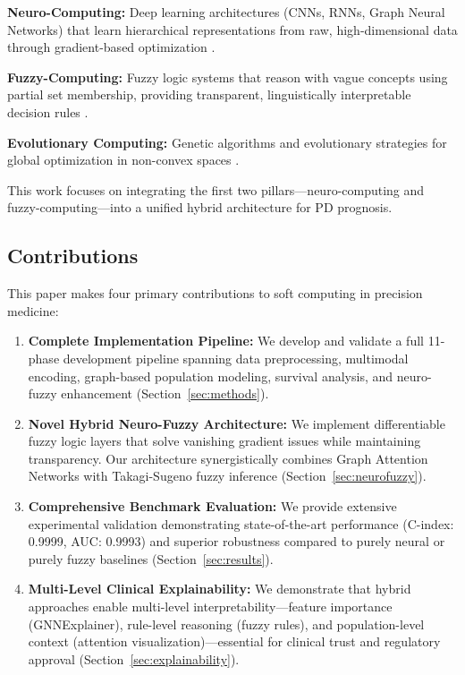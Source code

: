 \documentclass[conference]{IEEEtran}
\begin{document}
\textbf{Neuro-Computing:} Deep learning architectures (CNNs, RNNs, Graph Neural Networks) that learn hierarchical representations from raw, high-dimensional data through gradient-based optimization \cite{lecun2015deep}.

\textbf{Fuzzy-Computing:} Fuzzy logic systems that reason with vague concepts using partial set membership, providing transparent, linguistically interpretable decision rules \cite{zadeh1965fuzzy}.

\textbf{Evolutionary Computing:} Genetic algorithms and evolutionary strategies for global optimization in non-convex spaces \cite{goldberg1989genetic}.

This work focuses on integrating the first two pillars---neuro-computing and fuzzy-computing---into a unified hybrid architecture for PD prognosis.

\subsection{Contributions}

This paper makes four primary contributions to soft computing in precision medicine:

\begin{enumerate}
    \item \textbf{Complete Implementation Pipeline:} We develop and validate a full 11-phase development pipeline spanning data preprocessing, multimodal encoding, graph-based population modeling, survival analysis, and neuro-fuzzy enhancement (Section~\ref{sec:methods}).
    
    \item \textbf{Novel Hybrid Neuro-Fuzzy Architecture:} We implement differentiable fuzzy logic layers that solve vanishing gradient issues while maintaining transparency. Our architecture synergistically combines Graph Attention Networks with Takagi-Sugeno fuzzy inference (Section~\ref{sec:neurofuzzy}).
    
    \item \textbf{Comprehensive Benchmark Evaluation:} We provide extensive experimental validation demonstrating state-of-the-art performance (C-index: 0.9999, AUC: 0.9993) and superior robustness compared to purely neural or purely fuzzy baselines (Section~\ref{sec:results}).
    
    \item \textbf{Multi-Level Clinical Explainability:} We demonstrate that hybrid approaches enable multi-level interpretability---feature importance (GNNExplainer), rule-level reasoning (fuzzy rules), and population-level context (attention visualization)---essential for clinical trust and regulatory approval (Section~\ref{sec:explainability}).
\end{enumerate}
\end{document}
